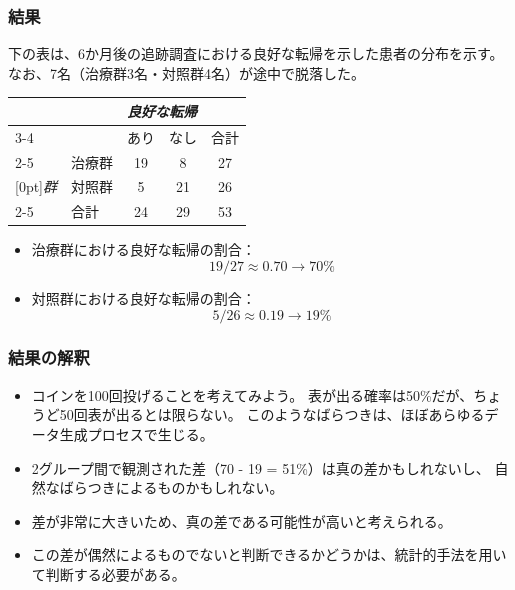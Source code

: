 
\begin{frame}
\frametitle{結果}

下の表は、6か月後の追跡調査における良好な転帰を示した患者の分布を示す。
なお、7名（治療群3名・対照群4名）が途中で脱落した。

\begin{center}
\begin{tabular}{ll  cc c}
			&				& \multicolumn{2}{c}{\textit{良好な転帰}} \\
\cline{3-4}
			&							& あり 	& なし 	& 合計	\\
\cline{2-5}
						&治療群 	& 19	 	& 8		& 27 	\\
\raisebox{1.5ex}[0pt]{\textit{群}}	&対照群		& 5	 	& 21	 	& 26 \\
\cline{2-5}
						&合計		& 24		& 29		& 53
\end{tabular}
\end{center}

\begin{itemize}

\item 治療群における良好な転帰の割合：
\[ 19 / 27 \approx 0.70 \rightarrow 70\% \]

\item 対照群における良好な転帰の割合：
\[ 5 / 26 \approx 0.19 \rightarrow 19\% \]

\end{itemize}

\end{frame}


\begin{frame}
\frametitle{結果の解釈}


\begin{itemize}

\item コインを100回投げることを考えてみよう。
表が出る確率は50\%だが、ちょうど50回表が出るとは限らない。
このようなばらつきは、ほぼあらゆるデータ生成プロセスで生じる。

\item 2グループ間で観測された差（70 - 19 = 51\%）は真の差かもしれないし、
自然なばらつきによるものかもしれない。

\item 差が非常に大きいため、真の差である可能性が高いと考えられる。

\item この差が偶然によるものでないと判断できるかどうかは、統計的手法を用いて判断する必要がある。

\end{itemize}

\end{frame}

